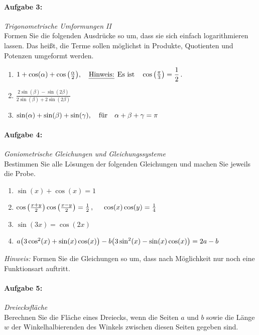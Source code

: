 \paragraph{Aufgabe 3: } \emph{Trigonometrische Umformungen II}\\[0.2cm]
Formen Sie die folgenden Ausdrücke so um, dass sie sich einfach logarithmieren lassen. Das heißt, die Terme sollen möglichst in Produkte, Quotienten und Potenzen umgeformt werden.\\[-1.3em]

\begin{enumerate}[label=(\alph*)]
    \item $1+\cos(\alpha) + \cos\qty(\frac{\alpha}{2}), \qq{\emph{Hinweis:} Es ist} \cos\qty(\frac{\pi}{3})=\dfrac{1}{2}\,.$
    \item $\frac{2\sin(\beta) - \sin (2\beta)}{2\sin(\beta)+2\sin(2\beta)}$
    \item $\sin(\alpha)+\sin(\beta)+\sin(\gamma), \qq{für} \alpha+\beta+\gamma = \pi$
\end{enumerate}
%
\paragraph{Aufgabe 4: } \emph{Goniometrische Gleichungen und Gleichungssysteme}\\[0.2cm]
Bestimmen Sie alle Lösungen der folgenden Gleichungen und machen Sie jeweils die Probe.
\begin{enumerate}[label=(\alph*)]
    \item $\sin(x)+\cos(x)= 1$
    \item $\cos\qty(\frac{x+y}{2})\cos\qty(\frac{x-y}{2})=\frac{1}{2}\,, \hspace{0.5cm}\cos(x)\cos(y)=\frac{1}{4}$
    \item $\sin(3x)=\cos(2x)$
    \item $a\qty(3\cos^2(x)+\sin(x)\cos(x))-b\qty(3\sin^2(x)-\sin(x)\cos(x))=2a-b$
\end{enumerate}
\emph{Hinweis:} Formen Sie die Gleichungen so um, dass nach Möglichkeit  nur noch eine Funktionsart auftritt.

\paragraph{Aufgabe 5: } \emph{Dreiecksfläche}\\[0.2cm]
Berechnen Sie die Fläche eines Dreiecks, wenn die Seiten $a$ und $b$ sowie die Länge $w$ der Winkelhalbierenden des Winkels zwischen diesen Seiten gegeben sind.
